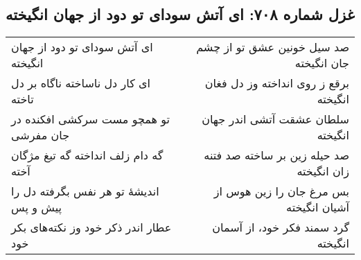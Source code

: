 \begin{center}
\section*{غزل شماره ۷۰۸: ای آتش سودای تو دود از جهان انگیخته}
\label{sec:708}
\begin{longtable}{l p{0.5cm} r}
ای آتش سودای تو دود از جهان انگیخته
&&
صد سیل خونین عشق تو از چشم جان انگیخته
\\
ای کار دل ناساخته ناگاه بر دل تاخته
&&
برقع ز روی انداخته وز دل فغان انگیخته
\\
تو همچو مست سرکشی افکنده در جان مفرشی
&&
سلطان عشقت آتشی اندر جهان انگیخته
\\
گه دام زلف انداخته گه تیغ مژگان آخته
&&
صد حیله زین بر ساخته صد فتنه زان انگیخته
\\
اندیشهٔ تو هر نفس بگرفته دل را پیش و پس
&&
بس مرغ جان را زین هوس از آشیان انگیخته
\\
عطار اندر ذکر خود وز نکته‌های بکر خود
&&
گرد سمند فکر خود، از آسمان انگیخته
\\
\end{longtable}
\end{center}

